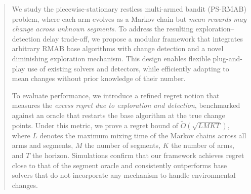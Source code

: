 \documentclass[twoside]{article}
\theoremstyle{plain}
\theoremstyle{definition}
\theoremstyle{remark}
\begin{document}
%

%


\begin{abstract}
We study the piecewise-stationary restless multi-armed bandit (PS-RMAB) problem, 
where each arm evolves as a Markov chain but \emph{mean rewards may change across unknown segments}. 
To address the resulting exploration--detection delay trade-off, we propose a modular framework that integrates 
arbitrary RMAB base algorithms with change detection and a novel diminishing exploration mechanism. 
This design enables flexible plug-and-play use of existing solvers and detectors, while efficiently adapting 
to mean changes without prior knowledge of their number. 

To evaluate performance, we introduce a refined regret notion that measures the 
\emph{excess regret due to exploration and detection}, benchmarked against an oracle that restarts 
the base algorithm at the true change points. 
Under this metric, we prove a regret bound of 
$\tilde{O}(\sqrt{LMKT})$, where $L$ denotes the maximum mixing time of the Markov chains across all arms and segments, $M$ the number of segments, 
$K$ the number of arms, and $T$ the horizon. 
Simulations confirm that our framework achieves regret close to that of the segment oracle and consistently outperforms base solvers that do not incorporate any mechanism to handle environmental changes. 
\end{abstract}
\end{document}
